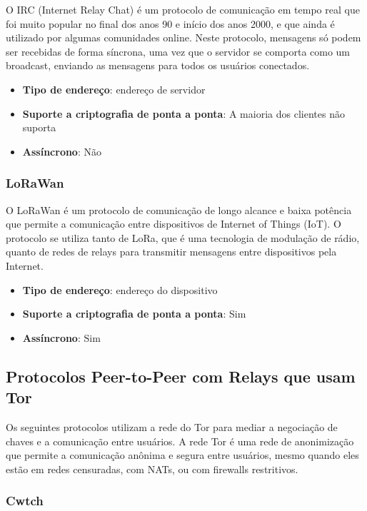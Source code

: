 O IRC (Internet Relay Chat) é um protocolo de comunicação em tempo real que foi muito popular no final dos anos 90 e início dos anos 2000, e que ainda é utilizado por algumas comunidades online. Neste protocolo, mensagens só podem ser recebidas de forma síncrona, uma vez que o servidor se comporta como um broadcast, enviando as mensagens para todos os usuários conectados. \cite{rfc2810}

\begin{itemize}
  \item \textbf{Tipo de endereço}: endereço de servidor
  \item \textbf{Suporte a criptografia de ponta a ponta}: A maioria dos clientes não suporta
  \item \textbf{Assíncrono}: Não
\end{itemize}

\subsubsection{LoRaWan}

O LoRaWan é um protocolo de comunicação de longo alcance e baixa potência que permite a comunicação entre dispositivos de Internet of Things (IoT). O protocolo se utiliza tanto de LoRa, que é uma tecnologia de modulação de rádio, quanto de redes de relays para transmitir mensagens entre dispositivos pela Internet. \cite{lorawan}

\begin{itemize}
  \item \textbf{Tipo de endereço}: endereço do dispositivo
  \item \textbf{Suporte a criptografia de ponta a ponta}: Sim
  \item \textbf{Assíncrono}: Sim
\end{itemize}

\subsection{Protocolos Peer-to-Peer com Relays que usam Tor}

Os seguintes protocolos utilizam a rede do Tor para mediar a negociação de chaves e a comunicação entre usuários. A rede Tor é uma rede de anonimização que permite a comunicação anônima e segura entre usuários, mesmo quando eles estão em redes censuradas, com NATs, ou com firewalls restritivos.

\subsubsection{Cwtch}

